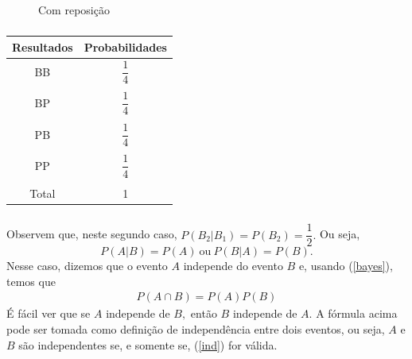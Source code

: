 \documentclass[14pt,aspectratio=1610]{beamer}
\begin{document}
\begin{frame}{}
\frametitle{}
\begin{block}{}
\begin{center}
\begin{figure}
\caption{Com reposição}
\end{figure}
\end{center}
\end{block}
\end{frame}

\begin{frame}{}
\frametitle{}
\begin{block}{}
\begin{table}[H]
\begin{tabular}{c|c}
\hline
Resultados&Probabilidades\\
\hline
BB&$\dfrac{1}{4}$\\
&\\
BP&$\dfrac{1}{4}$\\
&\\
PB&$\dfrac{1}{4}$\\
&\\
PP&$\dfrac{1}{4}$\\
&\\
\hline
Total&1\\
\hline
\end{tabular}
\end{table}
\end{block}
\end{frame}

\begin{frame}{}
\frametitle{}
\begin{block}{}
\justifying
Observem que, neste segundo caso, $P(B_{2}|B_{1})=P(B_{2})=\dfrac{1}{2}.$ Ou seja, 
$$P(A|B)=P(A)\ \textrm{ou}\ P(B|A)=P(B).$$ Nesse caso, dizemos que o evento $A$ independe do evento $B$ e, usando (\ref{bayes}), temos que 
\begin{align}\label{ind}
P(A\cap B)=P(A)P(B)
\end{align}
É fácil ver que se $A$ independe de $B,$ então $B$ independe de $A.$ A fórmula acima pode ser tomada como definição de independência entre dois eventos, ou seja, $A$ e $B$ são independentes se, e somente se, (\ref{ind}) for válida.

\end{block}
\end{frame}
\end{document}
